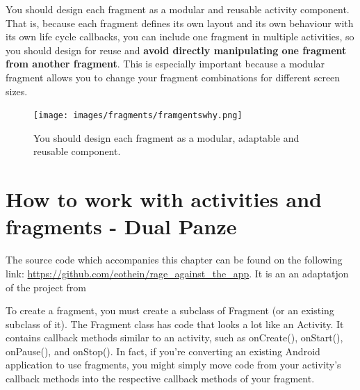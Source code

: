You should design each fragment as a modular and reusable activity component. That is, because each fragment defines its own layout and its own behaviour with its own life cycle callbacks, you can include one fragment in multiple activities, so you should design for reuse and \textbf{avoid directly manipulating one fragment from another fragment}. This is especially important because a modular fragment allows you to change your fragment combinations for different screen sizes.

\begin{figure}
	\centering
	\texttt{[image: images/fragments/framgentswhy.png]}
	\label{fig:whyfragments}
	\caption{You should design each fragment as a modular, adaptable and reusable component.}
\end{figure}

\section{How to work with activities and fragments - Dual Panze}

\begin{example}
	The source code which accompanies this chapter can be found on the following link: \url{https://github.com/eothein/rage_against_the_app}. It is an an adaptatjon of the project from \cite{Gleason2017a}

\end{example}


To create a fragment, you must create a subclass of Fragment (or an existing subclass of it). The Fragment class has code that looks a lot like an Activity. It contains callback methods similar to an activity, such as onCreate(), onStart(), onPause(), and onStop(). In fact, if you're converting an existing Android application to use fragments, you might simply move code from your activity's callback methods into the respective callback methods of your fragment.

